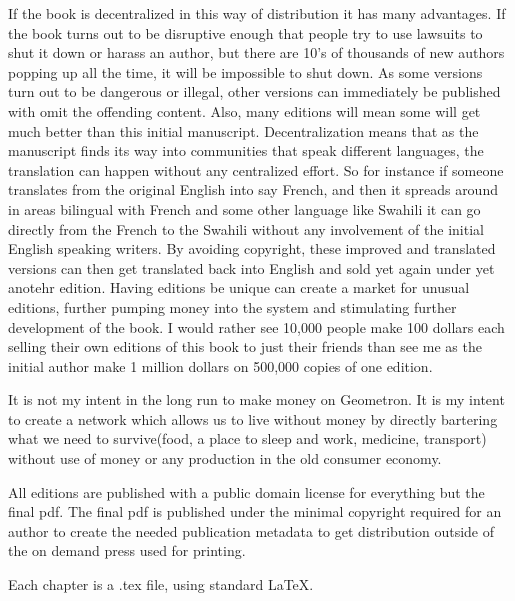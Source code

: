 If the book is decentralized in this way of distribution it has many advantages.  If the book turns out to be disruptive enough that people try to use lawsuits to shut it down or harass an author, but there are 10's of thousands of new authors popping up all the time, it will be impossible to shut down. As some versions turn out to be dangerous or illegal, other versions can immediately be published with omit the offending content. Also, many editions will mean some will get much better than this initial manuscript.  Decentralization means that as the manuscript finds its way into communities that speak different languages, the translation can happen without any centralized effort. So for instance if someone translates from the original English into say French, and then it spreads around in areas bilingual with French and some other language like Swahili it can go directly from the French to the Swahili without any involvement of the initial English speaking writers.  By avoiding copyright, these improved and translated versions can then get translated back into English and sold yet again under yet anotehr edition.  Having editions be unique can create a market for unusual editions, further pumping money into the system and stimulating further development of the book.  I would rather see 10,000 people make 100 dollars each selling their own editions of this book to just their friends than see me as the initial author make 1 million dollars on 500,000 copies of one edition.

It is not my intent in the long run to make money on Geometron. It is my intent to create a network which allows us to live without money by directly bartering what we need to survive(food, a place to sleep and work, medicine, transport) without use of money or any production in the old consumer economy.

All editions are published with a public domain license for everything but the final pdf.  The final pdf is published under the minimal copyright required for an author to create the needed publication metadata to get distribution outside of the on demand press used for printing.

Each chapter is a .tex file, using standard \LaTeX.